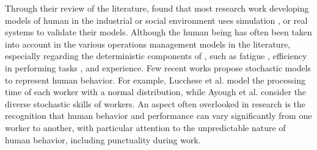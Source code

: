 \documentclass[review,12pt, 3p, times]{elsarticle}
\begin{document}
Through their review of the literature, \citep{Jahanmahin2022} found that most research work developing models of human  in the industrial or social environment uses simulation \citep{Digiesi2009}, or real systems to validate their models. 
Although the human being has often been taken into account in the various operations management models in the literature, especially regarding the deterministic components of , such as fatigue \cite{ferjani2017,Digiesi2009}, efficiency in performing tasks \cite{BERTI2021108151,digiesi2020human}, and experience\cite{korytkowski2017competences}. Few recent works propose stochastic models to represent human behavior. For example, Lucchese et al. \cite{lucchese2023stochastic} model the processing time of each worker with a normal distribution, while Ayough et al. \cite{ayough2023robust} consider the diverse stochastic skills of workers. An aspect often overlooked in research is the recognition that human behavior and performance can vary significantly from one worker to another, with particular attention to the unpredictable nature of human behavior, including punctuality during work. 
\end{document}
